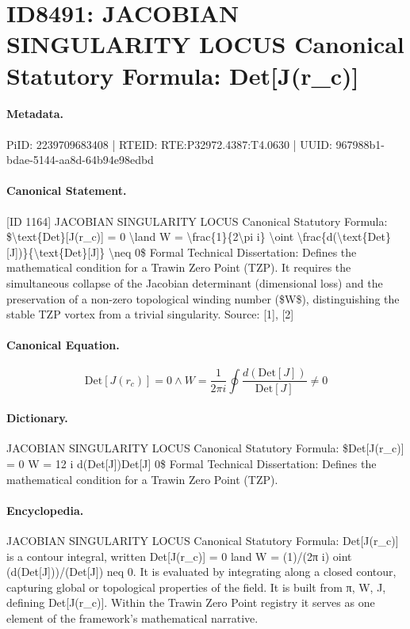 \section*{ID8491: JACOBIAN SINGULARITY LOCUS Canonical Statutory Formula: Det[J(r\_c)]}
\paragraph{Metadata.}
PiID: 2239709683408 | RTEID: RTE:P32972.4387:T4.0630 | UUID: 967988b1-bdae-5144-aa8d-64b94e98edbd

\paragraph{Canonical Statement.}
[ID 1164] JACOBIAN SINGULARITY LOCUS Canonical Statutory Formula: \$\textbackslash{}text\{Det\}[J(r\_c)] = 0 \textbackslash{}land W = \textbackslash{}frac\{1\}\{2\textbackslash{}pi i\} \textbackslash{}oint \textbackslash{}frac\{d(\textbackslash{}text\{Det\}[J])\}\{\textbackslash{}text\{Det\}[J]\} \textbackslash{}neq 0\$ Formal Technical Dissertation: Defines the mathematical condition for a Trawin Zero Point (TZP). It requires the simultaneous collapse of the Jacobian determinant (dimensional loss) and the preservation of a non-zero topological winding number (\$W\$), distinguishing the stable TZP vortex from a trivial singularity. Source: [1], [2]

\paragraph{Canonical Equation.}
\[
\text{Det}[J(r_c)] = 0 \land W = \frac{1}{2\pi i} \oint \frac{d(\text{Det}[J])}{\text{Det}[J]} \neq 0
\]

\paragraph{Dictionary.}
JACOBIAN SINGULARITY LOCUS Canonical Statutory Formula: \$Det[J(r\_c)] = 0 W = 12 i d(Det[J])Det[J] 0\$ Formal Technical Dissertation: Defines the mathematical condition for a Trawin Zero Point (TZP).

\paragraph{Encyclopedia.}
JACOBIAN SINGULARITY LOCUS Canonical Statutory Formula: Det[J(r\_c)] is a contour integral, written Det[J(r\_c)] = 0 land W = (1)/(2π i) oint (d(Det[J]))/(Det[J]) neq 0. It is evaluated by integrating along a closed contour, capturing global or topological properties of the field. It is built from π, W, J, defining Det[J(r\_c)]. Within the Trawin Zero Point registry it serves as one element of the framework's mathematical narrative.
